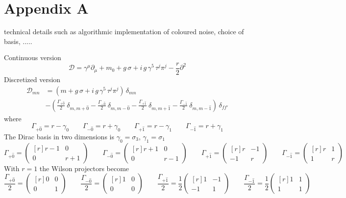 \section{Appendix A}
technical details such as algorithmic implementation of coloured noise, choice of basis, .....
\raggedright Continuous version
\begin{equation*}
    \mathcal{D} = \gamma^\mu \partial_\mu + m_0 + g \, \sigma + i \, g \, \gamma^5 \, \tau^j \pi^j - \frac{r}{2} \partial^2
\end{equation*}
Discretized version
\begin{align*}
    \mathcal{D}_{mn} &= (m + g \, \sigma + i \, g \, \gamma^5 \, \tau^j \pi^j) \, \delta_{mn} \\
    &- \left( \frac{\Gamma_{+ \hat 0}}{2} \ \delta_{m, m + \hat 0} - \frac{\Gamma_{- \hat 0}}{2} \ \delta_{m, m - \hat 0} - \frac{\Gamma_{+ \hat 1}}{2} \ \delta_{m, m + \hat 1} - \frac{\Gamma_{- \hat 1}}{2} \ \delta_{m, m - \hat 1} \right) \, \delta_{f f'}
\end{align*}
where 
\begin{equation*}
    \Gamma_{+\hat 0} =  r - \gamma_0  \qquad \Gamma_{-\hat 0} = r + \gamma_0 \qquad \Gamma_{+\hat 1} = r - \gamma_1 \qquad \Gamma_{-\hat 1} = r + \gamma_1
\end{equation*}
The Dirac basis in two dimensions is $\gamma_0 = \sigma_3$, $\gamma_1 = \sigma_1$ 
\begin{equation*}
    \Gamma_{+ \hat 0} = \begin{pmatrix*}[r] r - 1 & 0 \\ 0 & r + 1\end{pmatrix*} \qquad 
    \Gamma_{- \hat 0} = \begin{pmatrix*}[r] r + 1 & 0 \\ 0 & r - 1\end{pmatrix*} \qquad 
    \Gamma_{+ \hat 1} = \begin{pmatrix*}[r] r & -1 \\ -1 &  r\end{pmatrix*} \qquad
    \Gamma_{- \hat 1} = \begin{pmatrix*}[r] r & 1 \\ 1 & r\end{pmatrix*}
\end{equation*}
With $r=1$ the Wilson projectors become
\begin{equation*}
    \frac{\Gamma_{+ \hat 0}}{2} = \begin{pmatrix*}[r] 0 & 0 \\ 0 & 1\end{pmatrix*} \qquad 
    \frac{\Gamma_{- \hat 0}}{2} = \begin{pmatrix*}[r] 1 & 0 \\ 0 & 0\end{pmatrix*} \qquad 
    \frac{\Gamma_{+ \hat 1}}{2} = \frac{1}{2} \begin{pmatrix*}[r] 1 & -1 \\ -1 &  1\end{pmatrix*} \qquad
    \frac{\Gamma_{- \hat 1}}{2} = \frac{1}{2} \begin{pmatrix*}[r] 1 & 1 \\ 1 & 1\end{pmatrix*}
\end{equation*}